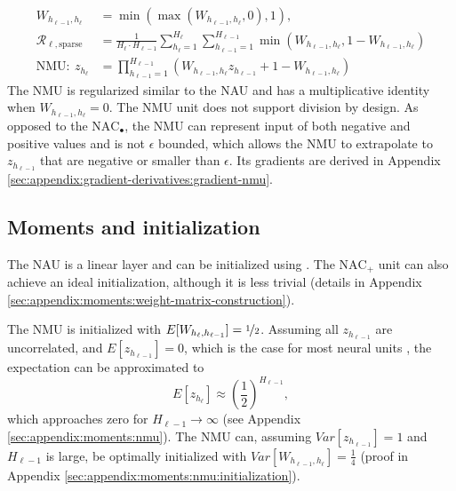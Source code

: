 \begin{align}
W_{h_{\ell-1},h_\ell} &= \min(\max(W_{h_{\ell-1},h_\ell}, 0), 1), \\
\mathcal{R}_{\ell,\mathrm{sparse}} &= \frac{1}{H_\ell \cdot H_{\ell-1}} \sum_{h_\ell=1}^{H_\ell} \sum_{h_{\ell-1}=1}^{H_{\ell-1}} \min\left(W_{h_{\ell-1},h_\ell}, 1 - W_{h_{\ell-1},h_\ell}\right) \\
\textrm{NMU}:\ z_{h_\ell} &= \prod_{h_{\ell-1}=1}^{H_{\ell-1}} \left(W_{h_{\ell-1},h_\ell} z_{h_{\ell-1}} + 1 - W_{h_{\ell-1},h_\ell} \right) \label{eq:nmu-defintion}
\end{align}
The NMU is regularized similar to the NAU and has a multiplicative identity when $W_{h_{\ell-1},h_\ell}=0$.
The NMU unit does not support division by design.
As opposed to the $\mathrm{NAC}_{\bullet}$, the NMU can represent input of both negative and positive values and is not $\epsilon$ bounded, which allows the NMU to extrapolate to $z_{h_{\ell-1}}$ that are negative or smaller than $\epsilon$. Its gradients are derived in Appendix \ref{sec:appendix:gradient-derivatives:gradient-nmu}.

\subsection{Moments and initialization}
The NAU is a linear layer and can be initialized using \citet{glorot-initialization}. The $\mathrm{NAC}_{+}$ unit can also achieve an ideal initialization, although it is less trivial (details in Appendix \ref{sec:appendix:moments:weight-matrix-construction}).

The NMU is initialized with $E[W_{h_{\ell}, h_{\ell - 1}}] = \nicefrac{1}{2}$. Assuming all $z_{h_{\ell-1}}$ are uncorrelated, and $E[z_{h_{\ell-1}}] = 0$, which is the case for most neural units \cite{glorot-initialization}, the expectation can be approximated to
\begin{equation}
E[z_{h_\ell}] \approx \left(\frac{1}{2}\right)^{H_{\ell-1}},
\end{equation}
which approaches zero for $H_{\ell-1} \rightarrow \infty$ (see Appendix \ref{sec:appendix:moments:nmu}). The NMU can, assuming $Var[z_{h_{\ell-1}}] = 1$ and $H_{\ell-1}$ is large, be optimally initialized with $Var[W_{h_{\ell-1},h_\ell}] = \frac{1}{4}$ (proof in Appendix \ref{sec:appendix:moments:nmu:initialization}).

